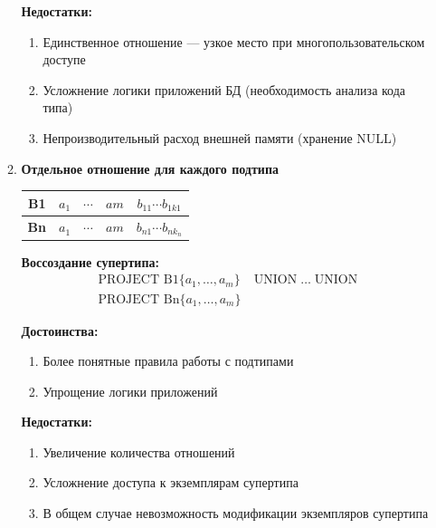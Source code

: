 \documentclass[a4paper,12pt]{article}
\begin{document}
\begin{enumerate}
\begin{enumerate}[label=6\alph*.]
        \textbf{Недостатки:}
        \begin{enumerate}
            \item Единственное отношение — узкое место при многопользовательском доступе
            \item Усложнение логики приложений БД (необходимость анализа кода типа)
            \item Непроизводительный расход внешней памяти (хранение NULL)
        \end{enumerate}
        
        \item \textbf{Отдельное отношение для каждого подтипа}
        
        \begin{center}
            \begin{tabular}{|c|c|c|c|c|}
                \hline
                \textbf{B1} & $a_1$ & $\cdots$ & $am$ & $b_{11} \cdots b_{1k1}$ \\
                \hline
                \textbf{Bn} & $a_1$ & $\cdots$ & $am$ & $b_{n1} \cdots b_{nk_{n}}$ \\
                \hline
            \end{tabular}
        \end{center}
        
        \textbf{Воссоздание супертипа:}
        \begin{align*}
    \text{PROJECT B1} \{a_1, \ldots, a_m\} \; &\text{UNION} \; \ldots \; \text{UNION} \\
    \text{PROJECT Bn} \{a_1, \ldots, a_m\}
\end{align*}
        
        \textbf{Достоинства:}
        \begin{enumerate}
            \item Более понятные правила работы с подтипами
            \item Упрощение логики приложений
        \end{enumerate}
        
        \textbf{Недостатки:}
        \begin{enumerate}
            \item Увеличение количества отношений
            \item Усложнение доступа к экземплярам супертипа
            \item В общем случае невозможность модификации экземпляров супертипа
        \end{enumerate}
    \end{enumerate}
    

\end{enumerate}
\end{document}
